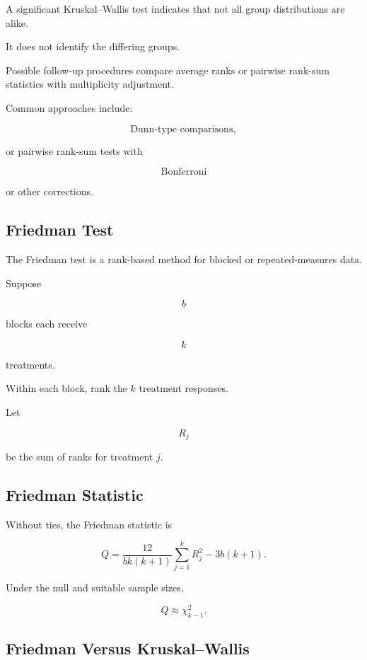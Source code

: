A significant Kruskal--Wallis test indicates that not all group
distributions are alike.

It does not identify the differing groups.

Possible follow-up procedures compare average ranks or pairwise rank-sum
statistics with multiplicity adjustment.

Common approaches include:

\[
\boxed{
\text{Dunn-type comparisons},
}
\]

or pairwise rank-sum tests with

\[
\boxed{
\text{Bonferroni}
}
\]

or other corrections.

\subsection{Friedman Test}
\label{subsec:friedman-test}

The Friedman test is a rank-based method for blocked or repeated-measures
data.

Suppose

\[
b
\]

blocks each receive

\[
k
\]

treatments.

Within each block, rank the \(k\) treatment responses.

Let

\[
R_j
\]

be the sum of ranks for treatment \(j\).

\subsection{Friedman Statistic}
\label{subsec:friedman-statistic}

Without ties, the Friedman statistic is

\[
\boxed{
Q
=
\frac{
12
}{
bk(k+1)
}
\sum_{j=1}^{k}
R_j^2
-
3b(k+1).
}
\]

Under the null and suitable sample sizes,

\[
\boxed{
Q
\approx
\chi^2_{k-1}.
}
\]

\subsection{Friedman Versus Kruskal--Wallis}
\label{subsec:friedman-versus-kruskal}

